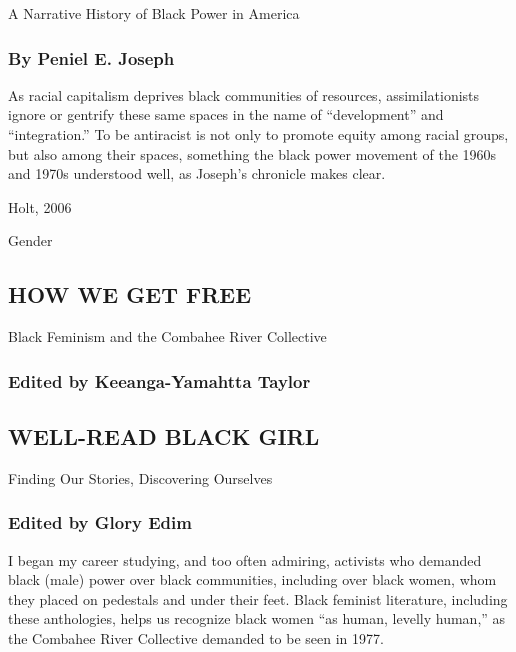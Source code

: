 A Narrative History of Black Power in America

\hypertarget{by-peniel-e-joseph}{%
\subsubsection{\texorpdfstring{\textbf{By Peniel E.
Joseph}}{By Peniel E. Joseph}}\label{by-peniel-e-joseph}}

As racial capitalism deprives black communities of resources,
assimilationists ignore or gentrify these same spaces in the name of
``development'' and ``integration.'' To be antiracist is not only to
promote equity among racial groups, but also among their spaces,
something the black power movement of the 1960s and 1970s understood
well, as Joseph's chronicle makes clear.

Holt, 2006

Gender

\hypertarget{how-we-get-free}{%
\subsection{HOW WE GET FREE}\label{how-we-get-free}}

Black Feminism and the Combahee River Collective

\hypertarget{edited-by-keeanga-yamahtta-taylor}{%
\subsubsection{\texorpdfstring{\textbf{Edited by Keeanga-Yamahtta
Taylor}}{Edited by Keeanga-Yamahtta Taylor}}\label{edited-by-keeanga-yamahtta-taylor}}

\hypertarget{well-read-black-girl}{%
\subsection{WELL-READ BLACK GIRL}\label{well-read-black-girl}}

Finding Our Stories, Discovering Ourselves

\hypertarget{edited-by-glory-edim}{%
\subsubsection{\texorpdfstring{\textbf{Edited by Glory
Edim}}{Edited by Glory Edim}}\label{edited-by-glory-edim}}

I began my career studying, and too often admiring, activists who
demanded black (male) power over black communities, including over black
women, whom they placed on pedestals and under their feet. Black
feminist literature, including these anthologies, helps us recognize
black women ``as human, levelly human,'' as the Combahee River
Collective demanded to be seen in 1977.

